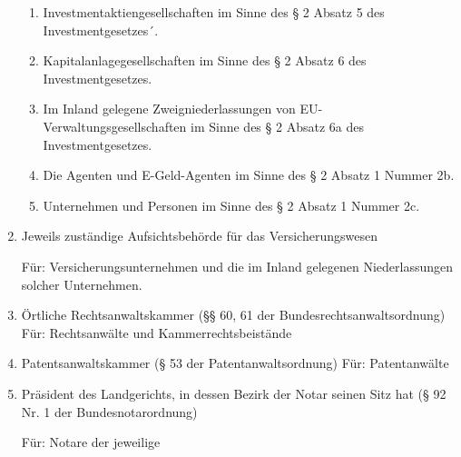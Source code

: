 \documentclass{article}
\begin{document}
\begin{enumerate}
\begin{enumerate}
                        \item

                            Investmentaktiengesellschaften im Sinne des § 2 Absatz 5 des
                            Investmentgesetzes´.

                        \item

                            Kapitalanlagegesellschaften im Sinne des § 2 Absatz 6 des
                            Investmentgesetzes.

                        \item

                            Im Inland gelegene Zweigniederlassungen von EU-
                            Verwaltungsgesellschaften im Sinne des § 2 Absatz 6a des
                            Investmentgesetzes.

                        \item

                            Die Agenten und E-Geld-Agenten im Sinne des § 2 Absatz 1 Nummer 2b.

                        \item

                            Unternehmen und Personen im Sinne des § 2 Absatz 1 Nummer 2c.

                    \end{enumerate}

                \item Jeweils zuständige Aufsichtsbehörde für das Versicherungswesen

                    Für: Versicherungsunternehmen und die im Inland gelegenen Niederlassungen solcher Unternehmen.

                \item Örtliche Rechtsanwaltskammer (§§ 60, 61 der Bundesrechtsanwaltsordnung)
                    Für: Rechtsanwälte und Kammerrechtsbeistände

                \item  Patentsanwaltskammer (§ 53 der Patentanwaltsordnung)
                    Für: Patentanwälte

                \item Präsident des Landgerichts, in dessen Bezirk der Notar seinen Sitz hat (§ 92 Nr. 1 der Bundesnotarordnung)

                    Für: Notare der jeweilige 


\end{enumerate}
\end{document}
